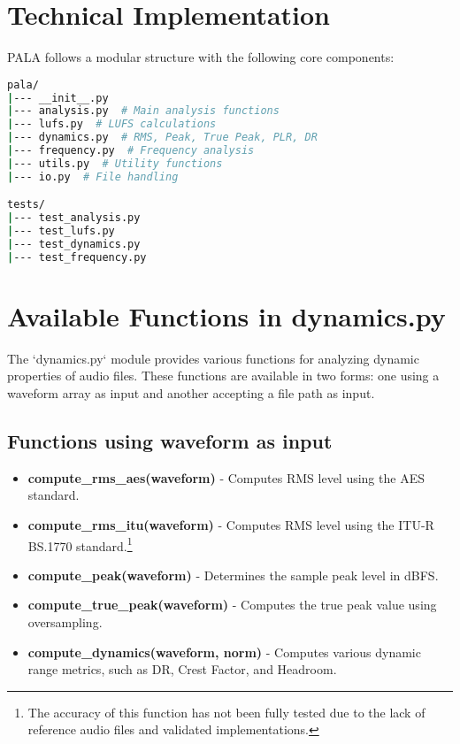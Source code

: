 \documentclass{article}
\begin{document}
\section{Technical Implementation}
PALA follows a modular structure with the following core components:
\begin{lstlisting}[language=bash]
pala/
|--- __init__.py
|--- analysis.py  # Main analysis functions
|--- lufs.py  # LUFS calculations
|--- dynamics.py  # RMS, Peak, True Peak, PLR, DR
|--- frequency.py  # Frequency analysis
|--- utils.py  # Utility functions
|--- io.py  # File handling

tests/
|--- test_analysis.py
|--- test_lufs.py
|--- test_dynamics.py
|--- test_frequency.py
\end{lstlisting}

\section{Available Functions in dynamics.py}
The `dynamics.py` module provides various functions for analyzing dynamic properties of audio files. These functions are available in two forms: one using a waveform array as input and another accepting a file path as input.

\subsection{Functions using waveform as input}
\begin{itemize}
    \item \textbf{compute\_rms\_aes(waveform)} - Computes RMS level using the AES standard.
    \item \textbf{compute\_rms\_itu(waveform)} - Computes RMS level using the ITU-R BS.1770 standard.\footnote{The accuracy of this function has not been fully tested due to the lack of reference audio files and validated implementations.}
    \item \textbf{compute\_peak(waveform)} - Determines the sample peak level in dBFS.
    \item \textbf{compute\_true\_peak(waveform)} - Computes the true peak value using oversampling.
    \item \textbf{compute\_dynamics(waveform, norm)} - Computes various dynamic range metrics, such as DR, Crest Factor, and Headroom.
\end{itemize}
\end{document}
